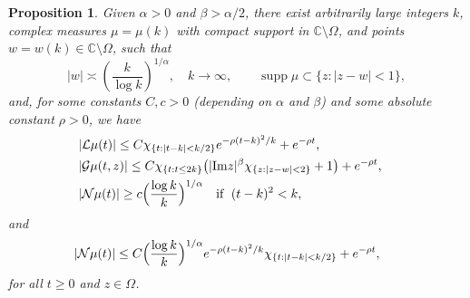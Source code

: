 \documentclass[11pt]{amsart}
\newtheorem{proposition}[theorem]{Proposition}
\theoremstyle{definition}
\theoremstyle{remark}
\numberwithin{equation}{section}
\begin{document}
\begin{proposition}\label{prop}
Given $\alpha>0$ and $\beta > \alpha/2$, there exist arbitrarily large integers $k$, complex measures $\mu=\mu(k)$ with compact support in $\mathbb C\setminus \Omega$, and points $w=w(k)\in \mathbb C\setminus \Omega$, such that
\begin{equation} \label{wk}
|w| \asymp  \left(\frac{k}{\log k} \right)^{1/\alpha}, \quad k\to\infty, \qquad {\operatorname{supp}}\mu\subset
\{z:|z-w|<1\},
\end{equation}
 and, for some constants $C,c>0$ (depending on $\alpha$ and $\beta$) and some absolute constant $\rho>0$, we have
\begin{align}
&\hskip-10pt |\mathcal{L}\mu(t)|\le
C\chi_{\{t:|t-k|<k/2\}}e^{-\rho(t-k)^2/k}+ e^{-\rho t}, \label{X3}\\
&\hskip-10pt  |\mathcal{G}\mu(t,z)| \le  C\chi_{\{t:t\le 2k\}}
\big(|{\operatorname{Im}} z|^{\beta}\chi_{\{z:|z-w|<2\}}+ 1\big)+e^{-\rho t}, \label{XQ4}\\%
&\hskip-10pt |\mathcal{N}\mu(t)| \ge c\Bigl(\frac{\log
k}{k}\Bigr)^{1/\alpha}\quad \text{if \;$(t-k)^2<k$},\label{X5}
\end{align}
and
\begin{equation}
\hskip-15pt |\mathcal{N}\mu(t)| \le C\Bigl(\frac{\log
k}{k}\Bigr)^{1/\alpha}e^{-\rho(t-k)^2/k}\chi_{\{t:|t-k|<k/2\}}+ e^{-\rho
t},\label{X6}
\end{equation}
for all $t\ge0$ and $z \in \Omega$.
\end{proposition}
\end{document}
